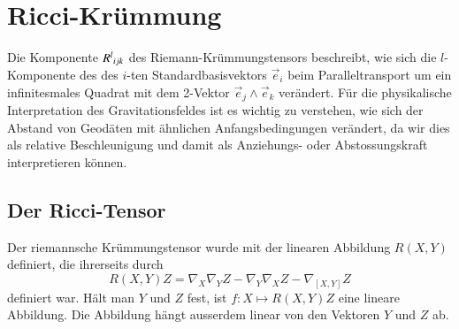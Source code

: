%
%
\section{Ricci-Krümmung
\label{buch:kruemmung:section:ricci}}

Die Komponente $R^l\mathstrut_{ijk}$  des Riemann-Krümmungstensors
beschreibt, wie sich die $l$-Komponente des des $i$-ten 
Standardbasisvektors $\vec{e}_i$ beim Paralleltransport um
ein infinitesmales Quadrat mit dem 2-Vektor $\vec{e}_j\wedge \vec{e}_k$
verändert.
Für die physikalische Interpretation des Gravitationsfeldes ist
es wichtig zu verstehen, wie sich der Abstand von Geodäten mit
ähnlichen Anfangsbedingungen verändert, da wir dies als relative
Beschleunigung und damit als Anziehungs- oder Abstossungskraft 
interpretieren können.

%
%
\subsection{Der Ricci-Tensor}
Der riemannsche Krümmungstensor wurde mit der linearen Abbildung
$R(X,Y)$ definiert, die ihrerseits durch
\[
R(X,Y)Z
=
\nabla_X\nabla_YZ - \nabla_Y\nabla_XZ-\nabla_{[X,Y]}Z
\]
definiert war.
Hält man $Y$ und $Z$ fest, ist $f:X\mapsto R(X,Y)Z$ eine lineare Abbildung.
Die Abbildung hängt ausserdem linear von den Vektoren $Y$ und $Z$ ab.

